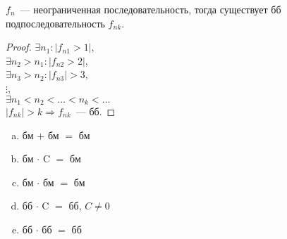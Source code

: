 \documentclass{article}
\begin{document}
	\begin{lemma}
		$f_n$~--- неограниченная последовательность, тогда существует бб подпоследовательность $f_{nk}$.
	\end{lemma}
	\begin{proof}
		$\exists n_1: |f_{n1} > 1|$, \\
		$\exists n_2 > n_1: |f_{n2} > 2|$, \\
		$\exists n_3 > n_2: |f_{n3}| > 3$, \\
		$\vdots$, \\
		$\exists n_1 < n_2 < \dots < n_k < \dots$ \\
		$|f_{nk}| > k \Rightarrow f_{nk}$~--- бб.
	\end{proof}
	\begin{lemma}
		\begin{enumerate}[a)]
			\item бм $+$ бм $=$ бм
			\item бм $\cdot$ C $=$ бм
			\item бм $\cdot$ бм $=$ бм
			\item бб $\cdot$ C $=$ бб, $C \not= 0$
			\item бб $\cdot$ бб $=$ бб
		\end{enumerate}
	\end{lemma}
\end{document}
